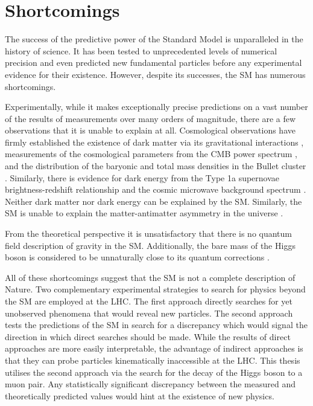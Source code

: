 \section{Shortcomings}

The success
of the predictive power of the Standard Model is unparalleled in the history of science.
It has been tested to unprecedented levels of numerical precision and even predicted new
fundamental particles before any experimental evidence for their existence. However,
despite its successes, the SM has numerous shortcomings.

Experimentally, while it makes exceptionally
precise predictions on a vast number of the results of measurements over many orders
of magnitude, there are a few observations that it is unable to explain at all.
Cosmological observations have firmly established the existence of dark matter via its
gravitational interactions \cite{Zwicky2008, rotation}, measurements of the
cosmological parameters from the CMB power spectrum \cite{Ade:2015}, and the
distribution of the baryonic and total mass densities in the Bullet cluster
\cite{Clowe:2006}. Similarly, there is evidence for dark energy
from the Type 1a supernovae brightness-redshift relationship
\cite{Knop:2003iy} and the cosmic microwave background spectrum \cite{Ade:2015}. Neither dark matter nor
dark energy can be explained by the SM. Similarly, the SM is unable to explain the
matter-antimatter asymmetry in the universe \cite{sarkar2007particle}.

From the theoretical perspective it is unsatisfactory that there is no quantum field description of gravity
in the SM. Additionally, the bare mass of the Higgs boson is considered to be
unnaturally close to its quantum corrections \cite{Schwartz:2013pla}.

All of these shortcomings suggest that the SM is not a complete description of Nature.
Two complementary experimental strategies to search for physics beyond the SM are
employed at the LHC. The first approach directly searches
for yet unobserved phenomena that would reveal new particles. The second approach tests
the predictions of the SM in search for a discrepancy which would signal the direction
in which direct searches should be made. While the results of direct approaches are
more easily interpretable, the advantage of indirect approaches is that they can probe
particles kinematically inaccessible at the LHC. This thesis utilises the second
approach via the search for the decay of the Higgs boson to a muon pair. Any
statistically significant discrepancy between the measured and theoretically predicted
values would hint at the existence of new physics.

